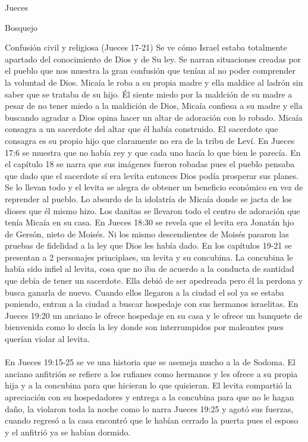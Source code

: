 \begin{section}{Jueces}
\begin{subsection}{Bosquejo}
\begin{enumerate}
\begin{enumerate}
					\end{enumerate}
			\end{enumerate}
		\end{subsection}
		\begin{subsection}{Confusión civil y religiosa (Jueces 17-21)}
			Se ve cómo Israel estaba totalmente apartado del conocimiento de Dios y de Su ley. Se narran situaciones creadas por el pueblo que nos muestra la gran confusión que tenían al no poder comprender la voluntad de Dios. Micaía le roba a su propia madre y ella maldice al ladrón sin saber que se trataba de su hijo. Él siente miedo por la maldción de su madre a pesar de no tener miedo a la maldición de Dios, Micaía confiesa a su madre y ella buscando agradar a Dios opina hacer un altar de adoración con lo robado. Micaía consagra a un sacerdote del altar que él había construido. El sacerdote que consagra es su propio hijo que claramente no era de la tribu de Leví. En Jueces 17:6 se muestra que no había rey y que cada uno hacía lo que bien le parecía.\newpage
			En el capítulo 18 se narra que sus imágenes fueron robadas pues el pueblo pensaba que dado que el sacerdote sí era levíta entonces Dios podía prosperar sus planes. Se lo llevan todo y el levita se alegra de obtener un beneficio económico en vez de reprender al pueblo. Lo absurdo de la idolatría de Micaía donde se jacta de los dioses que él mismo hizo. Los danitas se llevaron todo el centro de adoración que tenía Micaía en su casa. En Jueces 18:30 se revela que el levita era Jonatán hjo de Gersón, nieto de Moisés. Ni los mismo descendientes de Moisés pasaron las pruebas de fidelidad a la ley que Dios les había dado. 
			En los capítulos 19-21 se presentan a 2 personajes principlaes, un levita y su concubina. La concubina le había sido infiel al levita, cosa que no iba de acuerdo a la conducta de santidad que debía de tener un sacerdote. Ella debió de ser apedreada pero él la perdona y busca ganarla de nuevo. Cuando ellos llegaron a la ciudad el sol ya se estaba poniendo, entran a la ciudad a buscar hospedaje con sus hermanos israelitas. En Jueces 19:20 un anciano le ofrece hospedaje en su casa y le ofrece un banquete de bienvenida como lo decía la ley donde son interrumpidos por maleantes pues querían violar al levita.\\ \\
			En Jueces 19:15-25 se ve una historia que se asemeja mucho a la de Sodoma. El anciano anfitrión se refiere a los rufianes como hermanos y les ofrece a su propia hija y a la concubina para que hicieran lo que quisieran. El levita compartió la apreciación con su hospedadores y entrega a la concubina para que no le hagan daño, la violaron toda la noche como lo narra Jueces 19:25 y agotó sus fuerzas, cuando regresó a la casa encontró que le habían cerrado la puerta pues el esposo y el anfitrió ya se habían dormido.\\

\end{subsection}
\end{section}
